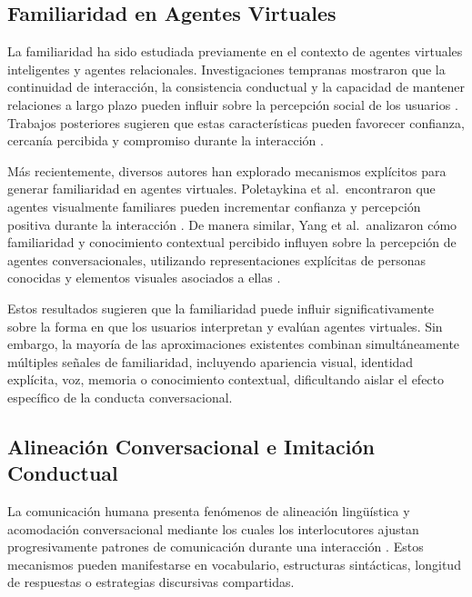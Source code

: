 \documentclass[sigconf, nonacm, language=spanish]{acmart}
\begin{document}
\subsection{Familiaridad en Agentes Virtuales}

La familiaridad ha sido estudiada previamente en el contexto de agentes virtuales inteligentes y agentes relacionales. Investigaciones tempranas mostraron que la continuidad de interacción, la consistencia conductual y la capacidad de mantener relaciones a largo plazo pueden influir sobre la percepción social de los usuarios \cite{bickmore_relational_2001}. Trabajos posteriores sugieren que estas características pueden favorecer confianza, cercanía percibida y compromiso durante la interacción \cite{bickmore_relational_2001}.

Más recientemente, diversos autores han explorado mecanismos explícitos para generar familiaridad en agentes virtuales. Poletaykina et al.\ encontraron que agentes visualmente familiares pueden incrementar confianza y percepción positiva durante la interacción \cite{poletaykina_knowing_2025}. De manera similar, Yang et al.\ analizaron cómo familiaridad y conocimiento contextual percibido influyen sobre la percepción de agentes conversacionales, utilizando representaciones explícitas de personas conocidas y elementos visuales asociados a ellas \cite{yang_exploring_2025}.

Estos resultados sugieren que la familiaridad puede influir significativamente sobre la forma en que los usuarios interpretan y evalúan agentes virtuales. Sin embargo, la mayoría de las aproximaciones existentes combinan simultáneamente múltiples señales de familiaridad, incluyendo apariencia visual, identidad explícita, voz, memoria o conocimiento contextual, dificultando aislar el efecto específico de la conducta conversacional.

\subsection{Alineación Conversacional e Imitación Conductual}

La comunicación humana presenta fenómenos de alineación lingüística y acomodación conversacional mediante los cuales los interlocutores ajustan progresivamente patrones de comunicación durante una interacción \cite{branigan_linguistic_2010}. Estos mecanismos pueden manifestarse en vocabulario, estructuras sintácticas, longitud de respuestas o estrategias discursivas compartidas.
\end{document}
